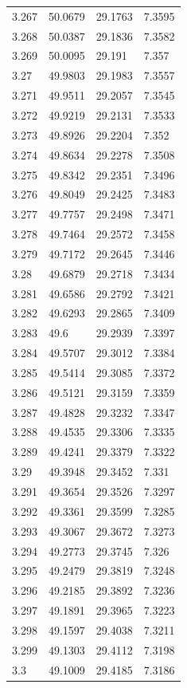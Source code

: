 \begin{tabular}{llll}
3.267 & 50.0679 & 29.1763 & 7.3595 \\
3.268 & 50.0387 & 29.1836 & 7.3582 \\
3.269 & 50.0095 & 29.191 & 7.357 \\
3.27 & 49.9803 & 29.1983 & 7.3557 \\
3.271 & 49.9511 & 29.2057 & 7.3545 \\
3.272 & 49.9219 & 29.2131 & 7.3533 \\
3.273 & 49.8926 & 29.2204 & 7.352 \\
3.274 & 49.8634 & 29.2278 & 7.3508 \\
3.275 & 49.8342 & 29.2351 & 7.3496 \\
3.276 & 49.8049 & 29.2425 & 7.3483 \\
3.277 & 49.7757 & 29.2498 & 7.3471 \\
3.278 & 49.7464 & 29.2572 & 7.3458 \\
3.279 & 49.7172 & 29.2645 & 7.3446 \\
3.28 & 49.6879 & 29.2718 & 7.3434 \\
3.281 & 49.6586 & 29.2792 & 7.3421 \\
3.282 & 49.6293 & 29.2865 & 7.3409 \\
3.283 & 49.6 & 29.2939 & 7.3397 \\
3.284 & 49.5707 & 29.3012 & 7.3384 \\
3.285 & 49.5414 & 29.3085 & 7.3372 \\
3.286 & 49.5121 & 29.3159 & 7.3359 \\
3.287 & 49.4828 & 29.3232 & 7.3347 \\
3.288 & 49.4535 & 29.3306 & 7.3335 \\
3.289 & 49.4241 & 29.3379 & 7.3322 \\
3.29 & 49.3948 & 29.3452 & 7.331 \\
3.291 & 49.3654 & 29.3526 & 7.3297 \\
3.292 & 49.3361 & 29.3599 & 7.3285 \\
3.293 & 49.3067 & 29.3672 & 7.3273 \\
3.294 & 49.2773 & 29.3745 & 7.326 \\
3.295 & 49.2479 & 29.3819 & 7.3248 \\
3.296 & 49.2185 & 29.3892 & 7.3236 \\
3.297 & 49.1891 & 29.3965 & 7.3223 \\
3.298 & 49.1597 & 29.4038 & 7.3211 \\
3.299 & 49.1303 & 29.4112 & 7.3198 \\
3.3 & 49.1009 & 29.4185 & 7.3186 \\

\end{tabular}
